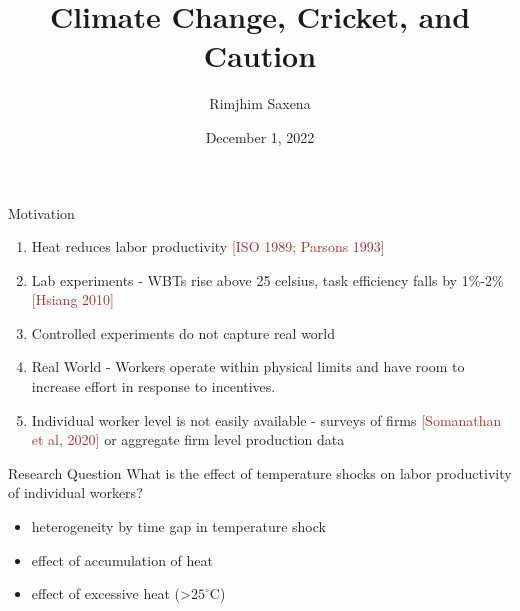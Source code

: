 \documentclass[
  10pt,
  ignorenonframetext,
  twocolumn]{beamer}
\title{Climate Change, Cricket, and Caution}
\author{Rimjhim Saxena}
\date{December 1, 2022}
\institute{University of Colorado Boulder}
\providecommand{\tightlist}{%
  \setlength{\itemsep}{0pt}\setlength{\parskip}{0pt}}
\begin{document}
\frame{\titlepage}

\begin{frame}{Motivation}
\protect\hypertarget{motivation}{}
\begin{enumerate}
\item
  Heat reduces labor productivity
  \textcolor{brown}{[ISO 1989; Parsons 1993]}
\item
  Lab experiments - WBTs rise above 25 celsius, task efficiency falls by
  1\%-2\% \textcolor{brown}{[Hsiang 2010]}
\item
  Controlled experiments do not capture real world
\item
  Real World - Workers operate within physical limits and have room to
  increase effort in response to incentives.
\item
  Individual worker level is not easily available - surveys of firms
  \textcolor{brown}{[Somanathan et al, 2020]} or aggregate firm level
  production data
\end{enumerate}
\end{frame}

\begin{frame}{Research Question}
\protect\hypertarget{research-question}{}
What is the effect of temperature shocks on labor productivity of
individual workers?

\begin{itemize}
\tightlist
\item
  heterogeneity by time gap in temperature shock
\item
  effect of accumulation of heat
\item
  effect of excessive heat (\textgreater{}\(25^\circ\)C)
\end{itemize}
\end{frame}
\end{document}
